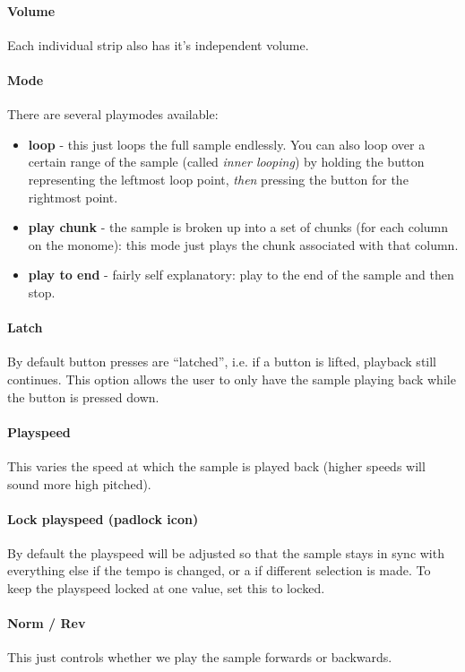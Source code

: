 \documentclass[10pt,a4paper]{report}
\begin{document}
\paragraph{Volume} Each individual strip also has it's independent volume.

\paragraph{Mode} There are several playmodes available:

\begin{itemize}
	\item \textbf{loop} - this just loops the full sample endlessly. You can also loop over a certain range of the sample (called \textit{inner looping}) by holding the button representing the leftmost loop point, \textit{then} pressing the button for the rightmost point.
	\item \textbf{play chunk} - the sample is broken up into a set of chunks (for each column on the monome): this mode just plays the chunk associated with that column.
	\item \textbf{play to end} - fairly self explanatory: play to the end of the sample and then stop.
\end{itemize}

\paragraph{Latch} By default button presses are ``latched'', i.e. if a button is lifted, playback still continues. This option allows the user to only have the sample playing back while the button is pressed down.

\paragraph{Playspeed} This varies the speed at which the sample is played back (higher speeds will sound more high pitched).

\paragraph{Lock playspeed (padlock icon)} By default the playspeed will be adjusted so that the sample stays in sync with everything else if the tempo is changed, or a if different selection is made. To keep the playspeed locked at one value, set this to locked.

\paragraph{Norm / Rev} This just controls whether we play the sample forwards or backwards.
\end{document}

